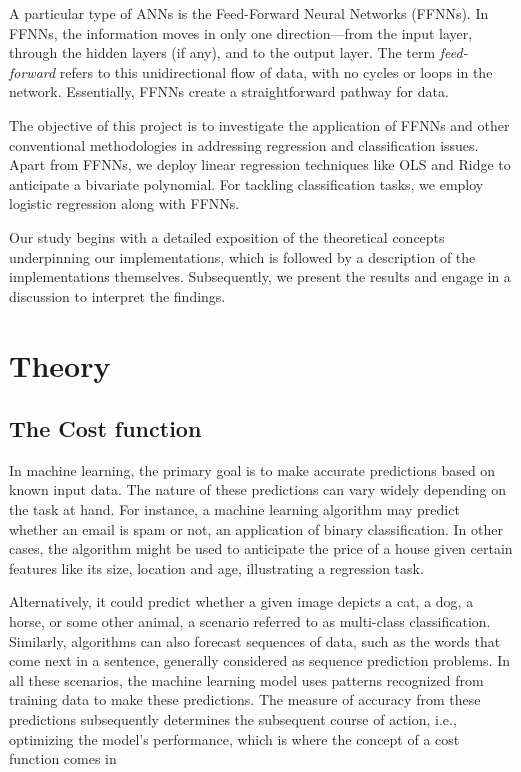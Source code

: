 \documentclass{article}
\theoremstyle{definition}
\begin{document}
A particular type of ANNs is the Feed-Forward Neural Networks (FFNNs). In FFNNs, the information moves in only one direction—from the input layer, through the hidden layers (if any), and to the output layer. The term \textit{feed-forward} refers to this unidirectional flow of data, with no cycles or loops in the network. Essentially, FFNNs create a straightforward pathway for data.

The objective of this project is to investigate the application of FFNNs and other conventional methodologies in addressing regression and classification issues. Apart from FFNNs, we deploy linear regression techniques like OLS and Ridge to anticipate a bivariate polynomial. For tackling classification tasks, we employ logistic regression along with FFNNs.

Our study begins with a detailed exposition of the theoretical concepts underpinning our implementations, which is followed by a description of the implementations themselves. Subsequently, we present the results and engage in a discussion to interpret the findings.


\newpage

\section{Theory}

\subsection{The Cost function}
In machine learning, the primary goal is to make accurate predictions based on known input data. The nature of these predictions can vary widely depending on the task at hand. For instance, a machine learning algorithm may predict whether an email is spam or not, an application of binary classification. In other cases, the algorithm might be used to anticipate the price of a house given certain features like its size, location and age, illustrating a regression task.

Alternatively, it could predict whether a given image depicts a cat, a dog, a horse, or some other animal, a scenario referred to as multi-class classification. Similarly, algorithms can also forecast sequences of data, such as the words that come next in a sentence, generally considered as sequence prediction problems. In all these scenarios, the machine learning model uses patterns recognized from training data to make these predictions. The measure of accuracy from these predictions subsequently determines the subsequent course of action, i.e., optimizing the model's performance, which is where the concept of a cost function comes in
\end{document}
